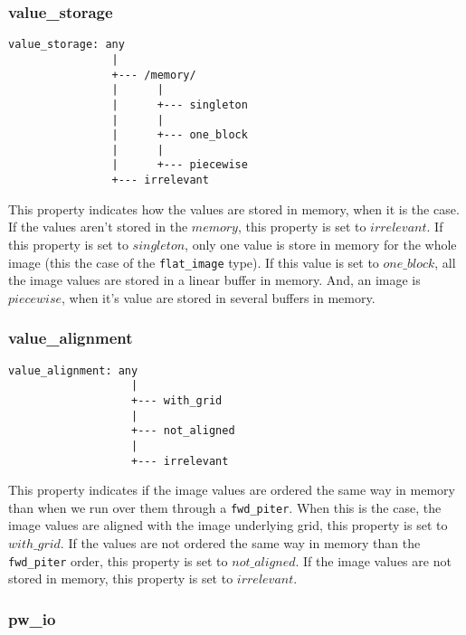 \subsubsection{value\_storage}

\begin{verbatim}
value_storage: any
                |
                +--- /memory/
                |      |
                |      +--- singleton
                |      |
                |      +--- one_block
                |      |
                |      +--- piecewise
                +--- irrelevant
\end{verbatim}

This property indicates how the values are stored in memory, when it is the
case. If the values aren't stored in the $memory$, this property is set to
$irrelevant$. If this property is set to $singleton$, only one value is store
in memory for the whole image (this the case of the \verb+flat_image+ type).
If this value is set to $one\_block$, all the image values are stored in a
linear buffer in memory. And, an image is $piecewise$, when it's value are
stored in several buffers in memory.


\subsubsection{value\_alignment}

\begin{verbatim}
value_alignment: any
                   |
                   +--- with_grid
                   |
                   +--- not_aligned
                   |
                   +--- irrelevant
\end{verbatim}

This property indicates if the image values are ordered the same way in memory
than when we run over them through a \verb+fwd_piter+.
When this is the case, the image values are aligned with the image underlying
grid, this property is set to $with\_grid$.
If the values are not ordered the same way in memory than the \verb+fwd_piter+
order, this property is set to $not\_aligned$.
If the image values are not stored in memory, this property is set to
$irrelevant$.



\subsubsection{pw\_io}

